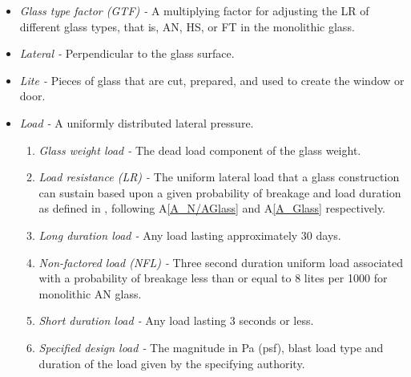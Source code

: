 \documentclass[12pt]{article}
\newcommand{\aref}[1]{A\ref{#1}}
\begin{document}
\begin{itemize}
\begin{enumerate}
\item \textit{Heat strengthened (HS) -} A flat, monolithic, glass lite of 
uniform thickness that has been subjected to a special heat treatment process 
where the residual surface compression is not less than 24 MPa (3500 psi) or 
greater than 52 MPa (7500 psi), as defined in \cite{ASTM2012a}.

\end{enumerate}
  
\item \textit{Glass type factor (GTF) -} A multiplying factor for adjusting the
  LR of different glass types, that is, AN, HS, or FT in the monolithic
  glass.  

\item \textit{Lateral -} Perpendicular to the glass surface.

\item \textit{Lite -} Pieces of glass that are cut, prepared, and used to create the window or door.

\item \textit{Load -} A uniformly distributed lateral pressure.

\begin{enumerate}
\item \textit{Glass weight load -} The dead load component of the glass weight. 
\item \textit{Load resistance (LR) -} The uniform lateral load that a glass 
construction can sustain based upon a given probability of breakage and load 
duration as defined in \cite[(pg. 1, 53)]{ASTM2009}, following \aref{A_N/AGlass} and \aref{A_Glass} respectively.
\item \textit{Long duration load -} Any load lasting approximately 30 days. 
\item \textit{Non-factored load (NFL) -} Three second duration uniform load 
associated with a probability of breakage less than or equal to 8 lites per 1000 
for monolithic AN glass.
\item \textit{Short duration load -} Any load lasting 3 seconds or less.
\item \textit{Specified design load -} The magnitude in Pa (psf), blast load type and duration of the load given by the specifying authority.



\end{enumerate}
\end{itemize}
\end{document}
